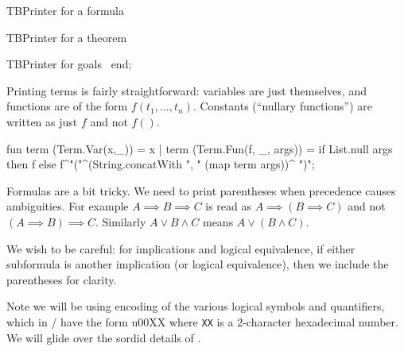 \LA{}TBPrinter for a formula~{\nwtagstyle{}}\RA{}

\LA{}TBPrinter for a theorem~{\nwtagstyle{}}\RA{}

\LA{}TBPrinter for goals~{\nwtagstyle{}}\RA{}
end;
\nwendcode{}\nwdocspar

\begin{node}
Printing terms is fairly straightforward: variables are just
themselves, and functions are of the form $f(t_{1},\dots,t_{n})$.
Constants (``nullary functions'') are written as just $f$ and not $f()$.
\end{node}

\nwenddocs{}\endmoddef\nwstartdeflinemarkup{}\nwenddeflinemarkup
fun term (Term.Var(x,_)) = x
  | term (Term.Fun(f, _, args)) =
      if List.null args
      then f
      else f^"("^(String.concatWith ", "
                                    (map term args))^
           ")";
\eatline
{}\nwendcode{}\nwdocspar
\begin{node}
Formulas are a bit tricky. We need to print parentheses when
precedence causes ambiguities. For example $A\implies B\implies C$
is read as $A\implies(B\implies C)$ and not $(A\implies B)\implies C$.
Similarly $A\lor B\land C$ means $A\lor(B\land C)$.

We wish to be careful: for implications and logical equivalence, if
either subformula is another implication (or logical equivalence),
then we include the parentheses for clarity.

Note we will be using  encoding of the various logical
symbols and quantifiers, which in \SML/ have the form {\Tt{}{\nwbackslash}u00XX\nwendquote} where
\texttt{XX} is a 2-character hexadecimal number. We will glide over
the sordid details of .
\end{node}

